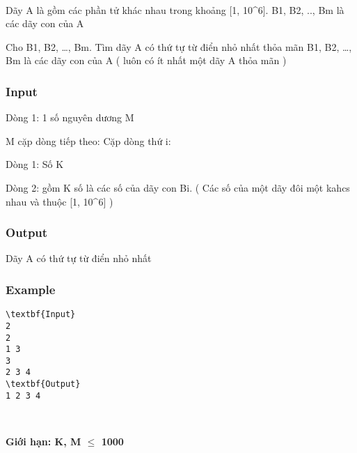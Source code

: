 

 

Dãy A là gồm các phần tử khác nhau trong khoảng [1, 10^6]. B1, B2, .., Bm là các dãy con của A

Cho B1, B2, …, Bm. Tìm dãy A có thứ tự từ điển nhỏ nhất thỏa mãn B1, B2, …, Bm là các dãy con của A ( luôn có ít nhất một dãy A thỏa mãn )

\subsubsection{Input}

Dòng 1: 1 số nguyên dương M

M cặp dòng tiếp theo: Cặp dòng thứ i:


Dòng 1: Số K


Dòng 2: gồm K số là các số của dãy con Bi. ( Các số của một dãy đôi một kahcs nhau và thuộc [1, 10^6] )

\subsubsection{Output}

Dãy A có thứ tự từ điển nhỏ nhất

\subsubsection{Example}
\begin{verbatim}
\textbf{Input}
2
2
1 3
3
2 3 4
\textbf{Output}
1 2 3 4\end{verbatim}

 

\textbf{Giới hạn: K, M  $\le$  1000}
